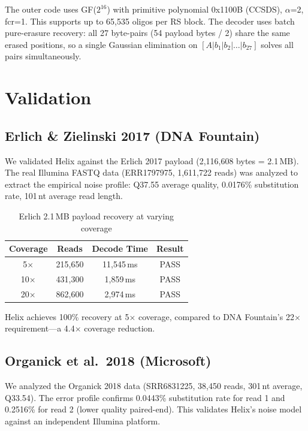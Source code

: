 \documentclass[11pt,a4paper]{article}
\begin{document}
The outer code uses GF($2^{16}$) with primitive polynomial 0x1100B (CCSDS), $\alpha$=2, fcr=1. This supports up to 65,535 oligos per RS block. The decoder uses batch pure-erasure recovery: all 27 byte-pairs (54 payload bytes / 2) share the same erased positions, so a single Gaussian elimination on $[A | b_1 | b_2 | \ldots | b_{27}]$ solves all pairs simultaneously.

\section{Validation}

\subsection{Erlich \& Zielinski 2017 (DNA Fountain)}

We validated Helix against the Erlich 2017 payload (2,116,608 bytes = 2.1\,MB). The real Illumina FASTQ data (ERR1797975, 1,611,722 reads) was analyzed to extract the empirical noise profile: Q37.55 average quality, 0.0176\% substitution rate, 101\,nt average read length.

\begin{table}[h]
\centering
\caption{Erlich 2.1\,MB payload recovery at varying coverage}
\begin{tabular}{cccc}
\toprule
Coverage & Reads & Decode Time & Result \\
\midrule
5$\times$ & 215,650 & 11,545\,ms & PASS \\
10$\times$ & 431,300 & 1,859\,ms & PASS \\
20$\times$ & 862,600 & 2,974\,ms & PASS \\
\bottomrule
\end{tabular}
\end{table}

Helix achieves 100\% recovery at 5$\times$ coverage, compared to DNA Fountain's 22$\times$ requirement---a 4.4$\times$ coverage reduction.

\subsection{Organick et al.\ 2018 (Microsoft)}

We analyzed the Organick 2018 data (SRR6831225, 38,450 reads, 301\,nt average, Q33.54). The error profile confirms 0.0443\% substitution rate for read 1 and 0.2516\% for read 2 (lower quality paired-end). This validates Helix's noise model against an independent Illumina platform.
\end{document}
